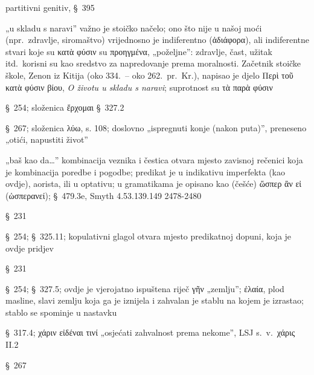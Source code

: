 \begin{description}[noitemsep]
\item[τοῦτο τοῦ χρόνου] partitivni genitiv, §~395
\item[κατὰ φύσιν] „u skladu s naravi” važno je stoičko načelo; ono što nije u našoj moći (npr.\ zdravlje, siromaštvo) vrijednosno je indiferentno (ἀδιάφορα), ali indiferentne stvari koje su κατὰ φύσιν su προηγμένα, „poželjne”: zdravlje, čast, užitak itd.\ korisni su kao sredstvo za napredovanje prema moralnosti. Začetnik stoičke škole, Zenon iz Kitija (oko 334.\ – oko 262.\ pr.~Kr.), napisao je djelo \textgreek{Περὶ τοῦ κατὰ φύσιν βίου,} \textit{O životu u skladu s naravi}; suprotnost su τὰ παρὰ φύσιν
\item[διελθεῖν] §~254; složenica ἔρχομαι §~327.2
\item[καταλῦσαι] §~267; složenica λύω, s. 108; doslovno „ispregnuti konje (nakon puta)”, preneseno „otići, napustiti život”
\item[ὡς ἂν εἰ] „baš kao da\dots” kombinacija veznika i čestica otvara mjesto zavisnoj rečenici koja je kombinacija poredbe i pogodbe; predikat je u indikativu imperfekta (kao ovdje), aorista, ili u optativu; u gramatikama je opisano kao (češće) ὥσπερ ἂν εἰ (ὡσπερανεί); §~479.3e, Smyth 4.53.139.149 2478-2480
\item[ἔπιπτεν] §~231
\item[πέπειρος γενομένη] §~254; §~325.11; kopulativni glagol otvara mjesto predikatnoj dopuni, koja je ovdje pridjev
\item[εὐφημοῦσα] §~231
\item[τὴν ἐνεγκοῦσαν] §~254; §~327.5; ovdje je vjerojatno ispuštena riječ γῆν
„zemlju”; \textgreek{ἐλαία,} plod masline, slavi zemlju koja ga je iznijela i zahvalan je stablu na kojem je izrastao; stablo se spominje u nastavku
\item[εἰδυῖα] §~317.4; χάριν εἰδέναι τινί „osjećati zahvalnost prema nekome”, LSJ s.~v.\ χάρις II.2
\item[φύσαντι] §~267
\end{description}



